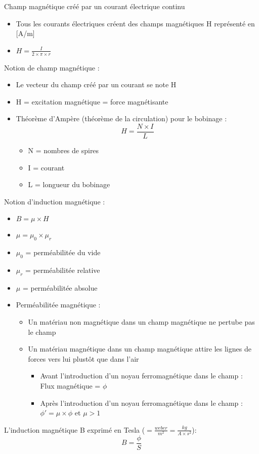 \documentclass[a4paper]{article}
\begin{document}
Champ magnétique créé par un courant électrique continu
\begin{itemize}
    \item Tous les courants électriques créent des champs magnétiques H représenté en [A/m]
    \item $H = \frac{I}{2 \times \pi \times r}$
\end{itemize}

\vspace{0.5cm}

Notion de champ magnétique :
\begin{itemize}
    \item Le vecteur du champ créé par un courant se note H
    \item H = excitation magnétique = force magnétisante
    \item Théorème d'Ampère (théorème de la circulation) pour le bobinage :
    $$H = \frac{N\times I}{L}$$
    \begin{itemize}
        \item N = nombres de spires
        \item I = courant
        \item L = longueur du bobinage
    \end{itemize}
\end{itemize}
\vspace{0.5cm}

Notion d'induction magnétique :
\begin{itemize}
    \item $B = \mu \times H$
    \item $\mu = \mu_0 \times \mu_r$
    \item $\mu_0$ = perméabilitée du vide
    \item $\mu_r$ = perméabilitée relative
    \item $\mu$ = perméabilitée absolue
    \item Perméabilitée magnétique :
    \begin{itemize}
        \item Un matériau non magnétique dans un champ magnétique ne pertube pas le champ
        \item Un matériau magnétique dans un champ magnétique attire les lignes de forces vers lui plustôt que dans l'air
        \begin{itemize}
            \item Avant l'introduction d'un noyau ferromagnétique dans le champ : Flux magnétique = $\phi$
            \item Après l'introduction d'un noyau ferromagnétique dans le champ : $\phi' = \mu \times \phi$ et $\mu > 1$
        \end{itemize}
    \end{itemize}
\end{itemize}
\vspace{0.5cm}
L'induction magnétique B exprimé en Tesla ($= \frac{weber}{m^2} = \frac{kg}{A \times s^2}$): $$B = \frac{\phi}{S}$$
\vspace{0.5cm}
\end{document}
